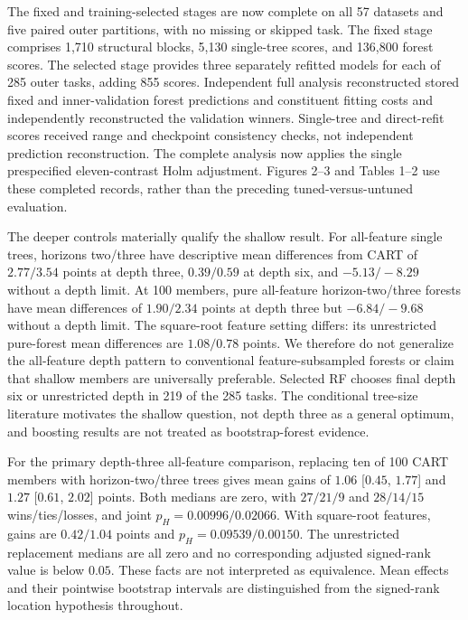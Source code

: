 
The fixed and training-selected stages are now complete on all 57 datasets
and five paired outer partitions, with no missing or skipped task. The fixed
stage comprises 1,710 structural blocks, 5,130 single-tree scores, and 136,800
forest scores. The selected stage provides three separately refitted models
for each of 285 outer tasks, adding 855 scores. Independent full analysis
reconstructed stored fixed and inner-validation forest predictions and
constituent fitting costs and independently reconstructed the validation
winners. Single-tree and direct-refit scores received range and checkpoint
consistency checks, not independent prediction reconstruction. The complete
analysis now applies the single prespecified eleven-contrast Holm adjustment.
Figures 2--3 and Tables 1--2 use these completed records, rather than the
preceding tuned-versus-untuned evaluation.

The deeper controls materially qualify the shallow result. For all-feature
single trees, horizons two/three have descriptive mean differences from CART
of $2.77/3.54$ points at depth three, $0.39/0.59$ at depth six, and
$-5.13/-8.29$ without a depth limit. At 100 members, pure all-feature
horizon-two/three forests have mean differences of $1.90/2.34$ points
at depth three but $-6.84/-9.68$ without a depth limit. The square-root
feature setting differs: its unrestricted pure-forest mean differences
are $1.08/0.78$ points. We therefore do not generalize the all-feature
depth pattern to conventional feature-subsampled forests or claim that
shallow members are universally preferable. Selected RF chooses final
depth six or unrestricted depth in 219 of the 285 tasks. The conditional
tree-size literature motivates the shallow question, not depth three as
a general optimum, and boosting results are not treated as bootstrap-forest
evidence.

For the primary depth-three all-feature comparison, replacing ten of 100
CART members with horizon-two/three trees gives mean gains of $1.06$
[$0.45$, $1.77$] and $1.27$ [$0.61$, $2.02$] points. Both medians
are zero, with $27/21/9$ and $28/14/15$ wins/ties/losses, and joint
$p_H=0.00996/0.02066$. With square-root features, gains are $0.42/1.04$
points and $p_H=0.09539/0.00150$. The unrestricted replacement medians
are all zero and no corresponding adjusted signed-rank value is below
$0.05$. These facts are not interpreted as equivalence. Mean effects and
their pointwise bootstrap intervals are distinguished from the signed-rank
location hypothesis throughout.

